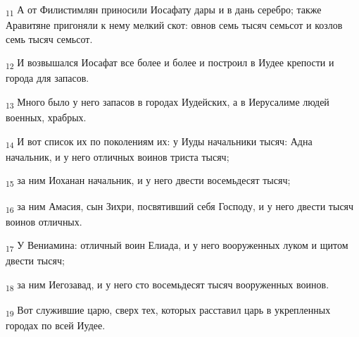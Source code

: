 \begin{tcolorbox}
\textsubscript{11} А от Филистимлян приносили Иосафату дары и в дань серебро; также Аравитяне пригоняли к нему мелкий скот: овнов семь тысяч семьсот и козлов семь тысяч семьсот.
\end{tcolorbox}
\begin{tcolorbox}
\textsubscript{12} И возвышался Иосафат все более и более и построил в Иудее крепости и города для запасов.
\end{tcolorbox}
\begin{tcolorbox}
\textsubscript{13} Много было у него запасов в городах Иудейских, а в Иерусалиме людей военных, храбрых.
\end{tcolorbox}
\begin{tcolorbox}
\textsubscript{14} И вот список их по поколениям их: у Иуды начальники тысяч: Адна начальник, и у него отличных воинов триста тысяч;
\end{tcolorbox}
\begin{tcolorbox}
\textsubscript{15} за ним Иоханан начальник, и у него двести восемьдесят тысяч;
\end{tcolorbox}
\begin{tcolorbox}
\textsubscript{16} за ним Амасия, сын Зихри, посвятивший себя Господу, и у него двести тысяч воинов отличных.
\end{tcolorbox}
\begin{tcolorbox}
\textsubscript{17} У Вениамина: отличный воин Елиада, и у него вооруженных луком и щитом двести тысяч;
\end{tcolorbox}
\begin{tcolorbox}
\textsubscript{18} за ним Иегозавад, и у него сто восемьдесят тысяч вооруженных воинов.
\end{tcolorbox}
\begin{tcolorbox}
\textsubscript{19} Вот служившие царю, сверх тех, которых расставил царь в укрепленных городах по всей Иудее.
\end{tcolorbox}
